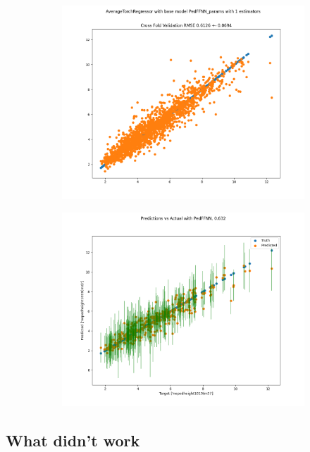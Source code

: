 \documentclass[a4paper, twoside, final, 12pt]{article}
\begin{document}
\begin{figure}
	\begin{subfigure}{0.49\linewidth}
		\centering 
		\includegraphics[scale=0.3]{./src/ANN_1}
		\caption{}
		\label{subfig:ann_1}
	\end{subfigure}
	\begin{subfigure}{0.5\linewidth}
		\centering
		\includegraphics[scale=0.3]{./src/ENSEMBLE_5}
		\caption{}
		\label{subfig:ensemble}
	\end{subfigure}
\end{figure}

\subsection{What didn't work}
\end{document}
